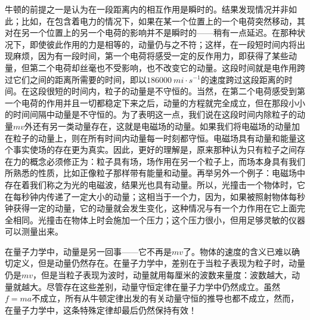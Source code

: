 牛顿的前提之一是认为在一段距离内的相互作用是瞬时的。结果发现情况并非如此；比如，在包含着电力的情况下，如果在某一个位置上的一个电荷突然移动，其对在另一个位置上的另一个电荷的影响并不是瞬时的——稍有一点延迟。在那种状况下，即使彼此作用的力是相等的，动量仍与之不符；这样，在一段短时间内将出现麻烦，因为有一段时间，第一个电荷将感受一定的反作用力，即获得了某些动量，但第二个电荷却丝毫也不受影响，也不改变它的动量。这段时间就是电作用跨过它们之间的距离所需要的时间，即以$186000~mi \cdot s^{-1}$的速度跨过这段距离的时间。在这段很短的时间内，粒子的动量是不守恒的。当然，在第二个电荷感受到第一个电荷的作用并且一切都稳定下来之后，动量的方程就完全成立，但在那段小小的时间间隔中动量是不守恒的。为了表明这一点，我们说在这段时间内除粒子的动量$mv$外还有另一类动量存在，这就是电磁场的动量。如果我们将电磁场的动量加在粒子的动量上，则在所有时间内动量每一时刻都守恒。电磁场具有动量和能量这个事实使场的存在更为真实。因此，更好的理解是，原来那种认为只有粒子之间存在力的概念必须修正为：粒子具有场，场作用在另一个粒子上，而场本身具有我们所熟悉的性质，比如正像粒子那样带有能量和动量。再举另外一个例子：电磁场中存在着我们称之为光的电磁波，结果光也具有动量。所以，光撞击一个物体时，它在每秒钟内传递了一定大小的动量；这相当于一个力，因为，如果被照射物体每秒钟获得一定的动量，它的动量就会发生变化，这种情况与有一个力作用在它上面完全相同。光撞击在物体上时会施加一个压力；这个压力很小，但用足够灵敏的仪器可以测量出来。

在量子力学中，动量是另一回事——它不再是$mv$了。物体的速度的含义已难以确切定义，但是动量仍然存在。在量子力学中，差别在于当粒子表现为粒子时，动量仍是$mv$，但是当粒子表现为波时，动量就用每厘米的波数来量度：波数越大，动量就越大。尽管存在这些差别，动量守恒定律在量子力学中仍然成立。虽然$f=ma$不成立，所有从牛顿定律出发的有关动量守恒的推导也都不成立，然而，在量子力学中，这条特殊定律却最后仍然保持有效！